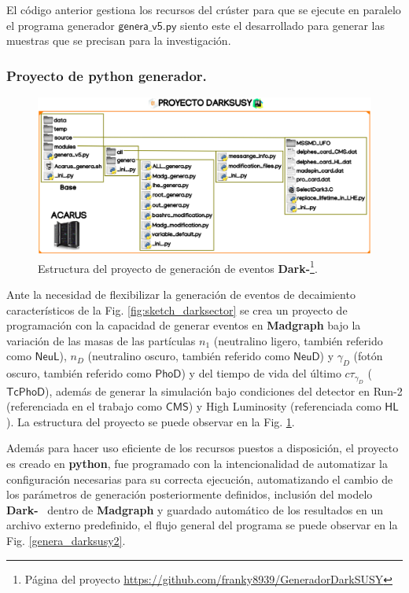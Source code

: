 El código anterior gestiona los recursos del crúster para que se ejecute en paralelo el programa generador $\textsf{genera\_v5.py}$ siento este el desarrollado para generar las muestras que se precisan para la investigación.

\subsubsection{Proyecto de python generador.}
\begin{figure}[!ht]
\centering
\includegraphics[width=1\textwidth]{Simulacion/imagenes/proyecto_darksusy.png}
\caption[Estructura del proyecto de generación de eventos \textbf{Dark-\SUSY}.]{Estructura del proyecto de generación de eventos \textbf{Dark-\SUSY}\footnote{Página del proyecto \href{https://github.com/franky8939/GeneradorDarkSUSY}{https://github.com/franky8939/GeneradorDarkSUSY}}.}
\label{genera_darksusy0}
\end{figure}

Ante la necesidad de flexibilizar la generación de eventos de decaimiento característicos de la Fig. \ref{fig:sketch_darksector} se crea un proyecto de programación con la capacidad de generar eventos en \textbf{Madgraph} bajo la variación de las masas de las partículas $n_1$ (neutralino ligero, también referido como $\textsf{NeuL}$), $n_D$ (neutralino oscuro, también referido como $\textsf{NeuD}$) y $\gamma_D$ (fotón oscuro, también referido como $\textsf{PhoD}$) y del tiempo de vida del último $c\tau_{\gamma_D}$ ($\textsf{TcPhoD}$), además de generar la simulación bajo condiciones del detector en Run-2 (referenciada en el trabajo como $\textsf{CMS}$) y High Luminosity (referenciada como $\textsf{HL}$). La estructura del proyecto se puede observar en la Fig. \ref{genera_darksusy0}.

Además para hacer uso eficiente de los recursos puestos a disposición, el proyecto es creado en \textbf{python}, fue programado con la intencionalidad de automatizar la configuración necesarias para su correcta ejecución, automatizando el cambio de los parámetros de generación posteriormente definidos, inclusión del modelo \textbf{Dark-}\SUSY ~ dentro de \textbf{Madgraph} y guardado automático de los resultados en un archivo externo predefinido, el flujo general del programa se puede observar en la Fig. \ref{genera_darksusy2}.


